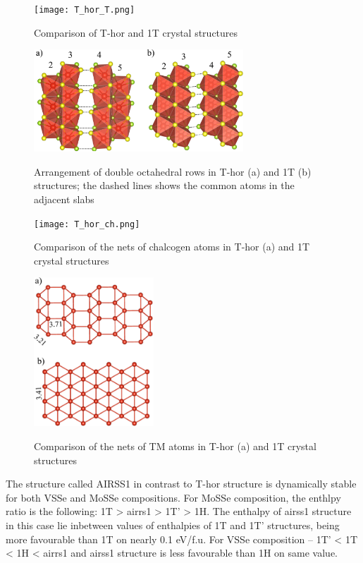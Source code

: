 \documentclass[a4paperm]{article}
\begin{document}
\begin{figure}[H]
	\texttt{[image: T\_hor\_T.png]} \\
	\caption{Comparison of T-hor and 1T crystal structures}
	\label{T_hor_T}
\end{figure}

\begin{figure}[H]
	\includegraphics[width=0.7\textwidth]{T_hor_slabs.png} \\
	\caption{Arrangement of double octahedral rows in T-hor (a) and 1T (b) structures; the dashed lines shows the common atoms in the adjacent slabs}
	\label{T_hor_slabs}
\end{figure}

\begin{figure}[H]
	\texttt{[image: T\_hor\_ch.png]} \\
	\caption{Comparison of the nets of chalcogen atoms in T-hor (a) and 1T crystal structures }
	\label{T_hor_ch}
\end{figure}

\begin{figure}[H]
	\includegraphics[width=0.4\textwidth]{T_hor_V.png} \\
	\caption{Comparison of the nets of TM atoms in T-hor (a) and 1T crystal structures }
	\label{T_hor_V}
\end{figure}


The structure called AIRSS1 in contrast to T-hor structure is dynamically stable for both VSSe and MoSSe compositions.
For MoSSe composition, the enthlpy ratio is the following: 1T > airrs1 > 1T' > 1H.
The enthalpy of airss1 structure in this case lie inbetween values of enthalpies of 1T and 1T' structures, being more favourable than 1T on nearly 0.1 eV/f.u.
For VSSe composition -- 1T' < 1T < 1H < airrs1 and airss1 structure is less favourable than 1H on same value.
\end{document}
